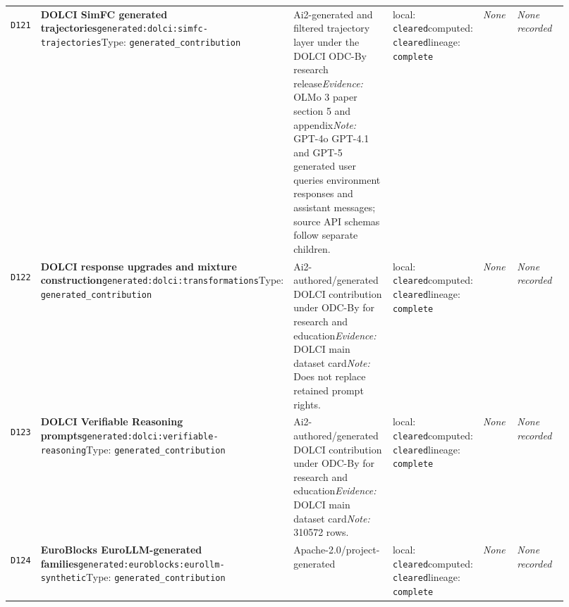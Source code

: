 \documentclass[9pt,a4paper]{article}
\newcommand{\depid}[1]{\hypertarget{dep:#1}{\texttt{#1}}}
\begin{document}
\begin{landscape}
\begin{longtable}{@{}L{0.035\linewidth}L{0.185\linewidth}L{0.27\linewidth}L{0.09\linewidth}L{0.10\linewidth}L{0.24\linewidth}@{}}
\depid{D121} & \textbf{DOLCI SimFC generated trajectories}\newline \nolinkurl{generated:dolci:simfc-trajectories}\newline Type: \texttt{generated\_contribution} & Ai2-generated and filtered trajectory layer under the DOLCI ODC-By research release\newline \textit{Evidence:} OLMo 3 paper section 5 and appendix\newline \textit{Note:} GPT-4o GPT-4.1 and GPT-5 generated user queries environment responses and assistant messages; source API schemas follow separate children. & local: \texttt{cleared}\newline computed: \texttt{cleared}\newline lineage: \texttt{complete} & \textit{None} & \textit{None recorded} \\
\depid{D122} & \textbf{DOLCI response upgrades and mixture construction}\newline \nolinkurl{generated:dolci:transformations}\newline Type: \texttt{generated\_contribution} & Ai2-authored/generated DOLCI contribution under ODC-By for research and education\newline \textit{Evidence:} DOLCI main dataset card\newline \textit{Note:} Does not replace retained prompt rights. & local: \texttt{cleared}\newline computed: \texttt{cleared}\newline lineage: \texttt{complete} & \textit{None} & \textit{None recorded} \\
\depid{D123} & \textbf{DOLCI Verifiable Reasoning prompts}\newline \nolinkurl{generated:dolci:verifiable-reasoning}\newline Type: \texttt{generated\_contribution} & Ai2-authored/generated DOLCI contribution under ODC-By for research and education\newline \textit{Evidence:} DOLCI main dataset card\newline \textit{Note:} 310572 rows. & local: \texttt{cleared}\newline computed: \texttt{cleared}\newline lineage: \texttt{complete} & \textit{None} & \textit{None recorded} \\
\depid{D124} & \textbf{EuroBlocks EuroLLM-generated families}\newline \nolinkurl{generated:euroblocks:eurollm-synthetic}\newline Type: \texttt{generated\_contribution} & Apache-2.0/project-generated & local: \texttt{cleared}\newline computed: \texttt{cleared}\newline lineage: \texttt{complete} & \textit{None} & \textit{None recorded} \\

\end{longtable}
\end{landscape}
\end{document}
